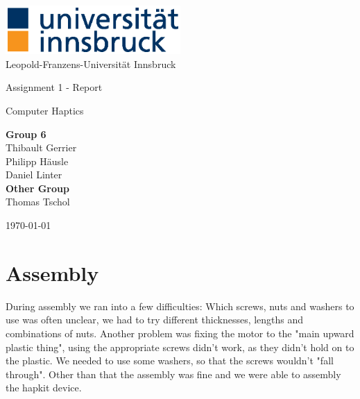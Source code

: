 \documentclass[12pt, a4paper]{article}
\begin{document}

\begin{titlepage} 						%
\centering								%

\begin{center}
	\includegraphics[width=0.5\textwidth]{universitaet-innsbruck-logo-cmyk-farbe} \\
	Leopold-Franzens-Universität Innsbruck
\end{center}

\vfill

\Huge{Assignment 1 - Report}

\vspace{0.5cm}

\Large{Computer Haptics}

\vfill
\hfill

\begin{center}
\textbf{Group 6} \\
Thibault Gerrier \\
Philipp Häusle \\
Daniel Linter \\
\vspace{0.5cm}
\textbf{Other Group} \\
Thomas Tschol \\

\vspace*{\fill}

\end{center}

\begin{center}
	\today
\end{center}

\end{titlepage}	
\section{Assembly} \label{sec:ass}
During assembly we ran into a few difficulties: Which screws, nuts and washers to use was often unclear, we had to try different thicknesses, lengths and combinations of nuts. Another problem was fixing the motor to the "main upward plastic thing", using the appropriate screws didn't work, as they didn’t hold on to the plastic. We needed to use some washers, so that the screws wouldn’t "fall through". Other than that the assembly was fine and we were able to assembly the hapkit device.
\end{document}
